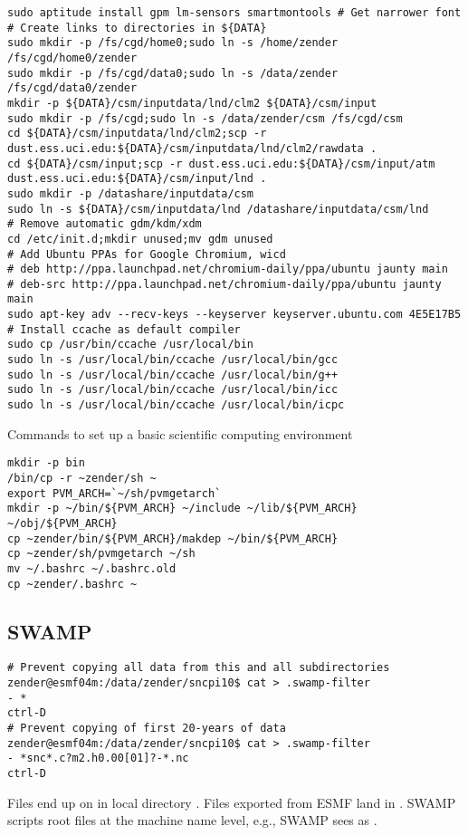 \documentclass[12pt,twoside]{article}
\begin{document}
\begin{verbatim}
sudo aptitude install gpm lm-sensors smartmontools # Get narrower font
# Create links to directories in ${DATA}
sudo mkdir -p /fs/cgd/home0;sudo ln -s /home/zender /fs/cgd/home0/zender
sudo mkdir -p /fs/cgd/data0;sudo ln -s /data/zender /fs/cgd/data0/zender
mkdir -p ${DATA}/csm/inputdata/lnd/clm2 ${DATA}/csm/input
sudo mkdir -p /fs/cgd;sudo ln -s /data/zender/csm /fs/cgd/csm
cd ${DATA}/csm/inputdata/lnd/clm2;scp -r dust.ess.uci.edu:${DATA}/csm/inputdata/lnd/clm2/rawdata .
cd ${DATA}/csm/input;scp -r dust.ess.uci.edu:${DATA}/csm/input/atm dust.ess.uci.edu:${DATA}/csm/input/lnd .
sudo mkdir -p /datashare/inputdata/csm
sudo ln -s ${DATA}/csm/inputdata/lnd /datashare/inputdata/csm/lnd
# Remove automatic gdm/kdm/xdm
cd /etc/init.d;mkdir unused;mv gdm unused
# Add Ubuntu PPAs for Google Chromium, wicd
# deb http://ppa.launchpad.net/chromium-daily/ppa/ubuntu jaunty main 
# deb-src http://ppa.launchpad.net/chromium-daily/ppa/ubuntu jaunty main 
sudo apt-key adv --recv-keys --keyserver keyserver.ubuntu.com 4E5E17B5
# Install ccache as default compiler
sudo cp /usr/bin/ccache /usr/local/bin
sudo ln -s /usr/local/bin/ccache /usr/local/bin/gcc
sudo ln -s /usr/local/bin/ccache /usr/local/bin/g++
sudo ln -s /usr/local/bin/ccache /usr/local/bin/icc
sudo ln -s /usr/local/bin/ccache /usr/local/bin/icpc
\end{verbatim}

Commands to set up a basic scientific computing environment
\begin{verbatim}
mkdir -p bin
/bin/cp -r ~zender/sh ~
export PVM_ARCH=`~/sh/pvmgetarch`
mkdir -p ~/bin/${PVM_ARCH} ~/include ~/lib/${PVM_ARCH} ~/obj/${PVM_ARCH}
cp ~zender/bin/${PVM_ARCH}/makdep ~/bin/${PVM_ARCH}
cp ~zender/sh/pvmgetarch ~/sh
mv ~/.bashrc ~/.bashrc.old
cp ~zender/.bashrc ~
\end{verbatim}

\subsection{SWAMP}\label{sxn:swamp}
\begin{verbatim}
# Prevent copying all data from this and all subdirectories
zender@esmf04m:/data/zender/sncpi10$ cat > .swamp-filter
- *
ctrl-D
# Prevent copying of first 20-years of data
zender@esmf04m:/data/zender/sncpi10$ cat > .swamp-filter
- *snc*.c?m2.h0.00[01]?-*.nc
ctrl-D
\end{verbatim}
Files end up on  in local directory
.
Files exported from ESMF land in 
.
SWAMP scripts root files at the machine name level, e.g.,
SWAMP sees  as
.
\end{document}
